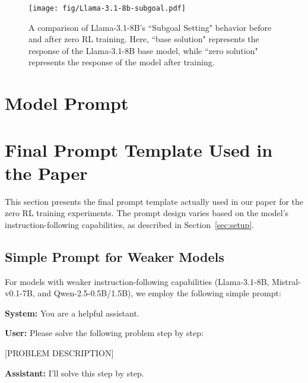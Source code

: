 \begin{figure}[!t]
        \centering
\texttt{[image: fig/Llama-3.1-8b-subgoal.pdf]}
\caption{A comparison of Llama-3.1-8B’s ``Subgoal Setting" behavior before and after zero RL training. Here, ``base solution" represents the response of the Llama-3.1-8B base model,
while ``zero solution" represents the response of the model after training.}
        \label{fig:llama3.1-8b_base_subgoal_setting}
\end{figure}

\section{Model Prompt}

\section{Final Prompt Template Used in the Paper}
\label{sec:final_prompt}

This section presents the final prompt template actually used in our paper for the zero RL training experiments. The prompt design varies based on the model's instruction-following capabilities, as described in Section~\ref{sec:setup}.

\subsection{Simple Prompt for Weaker Models}

For models with weaker instruction-following capabilities (Llama-3.1-8B, Mistral-v0.1-7B, and Qwen-2.5-0.5B/1.5B), we employ the following simple prompt:

\begin{tcolorbox}[
colback=lightblue!10,
colframe=lightblue,
left=2mm, right=2mm,
title=\textcolor{black}{\textbf{Simple Prompt Template}}]

\begin{small}
\textbf{System:} You are a helpful assistant.

\textbf{User:} Please solve the following problem step by step:

[PROBLEM DESCRIPTION]

\textbf{Assistant:} I'll solve this step by step.
\end{small}

\end{tcolorbox}

